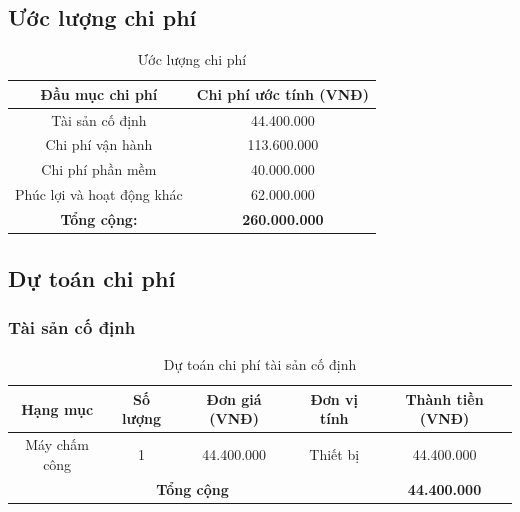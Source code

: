 \subsection{Ước lượng chi phí}
\begin{table}[H]
    \caption{Ước lượng chi phí}
    \centering
    \renewcommand{\arraystretch}{1.5} %
    \begin{tabular}{|c|c|}
        \hline
        \textbf{Đầu mục chi phí}                  & \textbf{Chi phí ước tính (VNĐ)} \\
        \hline
        Tài sản cố định                           & 44.400.000                      \\
        \hline
        Chi phí vận hành                          & 113.600.000                     \\
        \hline
        Chi phí phần mềm                          & 40.000.000                      \\
        \hline
        Phúc lợi và hoạt động khác                & 62.000.000                      \\
        \hline
        \multicolumn{1}{|c|}{\textbf{Tổng cộng:}} & \textbf{260.000.000}            \\
        \hline
    \end{tabular}
\end{table}

\subsection{Dự toán chi phí}
\subsubsection{Tài sản cố định}
\begin{table}[H]
    \caption{Dự toán chi phí tài sản cố định}
    \centering
    \renewcommand{\arraystretch}{1.5} %
    \begin{tabular}{|c|c|c|c|c|}
        \hline
        \textbf{Hạng mục}                        & \textbf{Số lượng}   & \textbf{Đơn giá (VNĐ)} & \textbf{Đơn vị tính} & \textbf{Thành tiền (VNĐ)} \\
        \hline
        Máy chấm công                            & 1                   & 44.400.000             & Thiết bị             & 44.400.000                \\
        \hline
        \multicolumn{4}{|c|}{\textbf{Tổng cộng}} & \textbf{44.400.000}                                                                             \\
        \hline
    \end{tabular}
\end{table}


